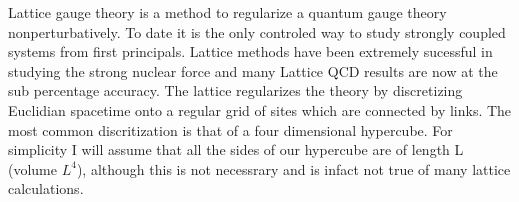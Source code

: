 
Lattice gauge theory is a method to regularize a quantum gauge theory nonperturbatively.
To date it is the only controled way to study strongly coupled systems from first principals.
Lattice methods have been extremely sucessful in studying the strong nuclear force and many Lattice QCD results are now at the sub percentage accuracy.
The lattice regularizes the theory by discretizing Euclidian spacetime onto a regular grid of sites which are connected by links.
The most common discritization is that of a four dimensional hypercube.
For simplicity I will assume that all the sides of our hypercube are of length L (volume $L^4$), although this is not necessrary and is infact not true of many lattice calculations.
